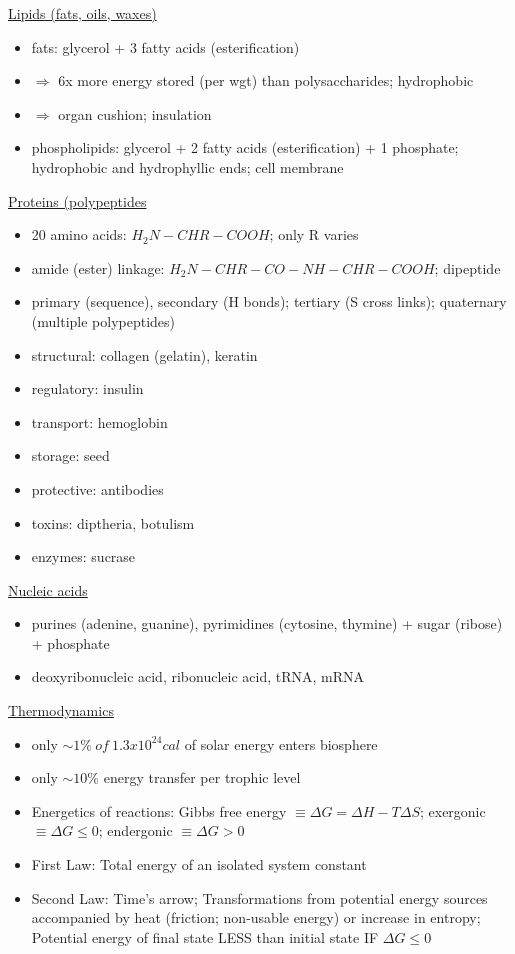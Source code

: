 \documentclass[12pt]{article}
\begin{document}
\underline{Lipids (fats, oils, waxes)}
\begin{itemize}
	\item fats: glycerol + 3 fatty acids (esterification)
	\item $ \Rightarrow $ 6x more energy stored (per wgt) than polysaccharides; hydrophobic
	\item $ \Rightarrow $ organ cushion; insulation
	\item phospholipids: glycerol + 2 fatty acids (esterification) + 1 phosphate; hydrophobic and hydrophyllic ends; cell membrane
\end{itemize}
\underline{Proteins (polypeptides}
\begin{itemize}
	\item 20 amino acids: $H_2N-CHR-COOH $; only R varies
	\item amide (ester) linkage: $H_2N-CHR-CO-NH-CHR-COOH$; dipeptide
	\item primary (sequence), secondary (H bonds); tertiary (S cross links); quaternary (multiple polypeptides)
	\item structural: collagen (gelatin), keratin
	\item regulatory: insulin
	\item transport: hemoglobin
	\item storage: seed
	\item protective: antibodies
	\item toxins: diptheria, botulism
	\item enzymes: sucrase  
\end{itemize}
\underline{Nucleic acids}
\begin{itemize}
	\item purines (adenine, guanine), pyrimidines (cytosine, thymine) + sugar (ribose) + phosphate
	\item deoxyribonucleic acid, ribonucleic acid, tRNA, mRNA
\end{itemize}
\underline{Thermodynamics}
\begin{itemize}
	\item only $\sim 1\% \ of \ 1.3x10^{24} cal$ of solar energy enters biosphere
	\item only $\sim 10\%$ energy transfer per trophic level
	\item Energetics of reactions: Gibbs free energy $\equiv \Delta G = \Delta H - T\Delta S$; exergonic $ \equiv \Delta G \leq 0$; endergonic	$ \equiv \Delta G > 0$
	\item First Law: Total energy of an isolated system constant
	\item Second Law: Time's arrow; Transformations from potential energy sources accompanied by heat (friction; non-usable energy) or increase in entropy;  Potential energy of final state LESS than initial state IF $\Delta G \leq 0$
\end{itemize}
\end{document}
